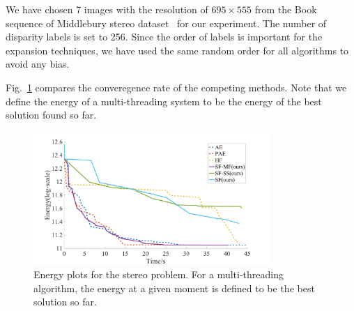 
\noindent We have chosen 7 images with the resolution of $695\times555$
from the Book sequence of Middlebury stereo dataset~\cite{middlebury_stereo} for our
experiment. The number of disparity labels is
set to 256. 
%
Since the order of labels is important for the expansion techniques,
we have used the same random order for all algorithms to avoid any
bias. 
%

Fig.~\ref{fig:stereo_global} compares the converegence rate of the
competing methods. Note that we define the energy of a multi-threading
system to be the energy of the best solution found so far.
%

\begin{figure}[tb]
\centering
\includegraphics[width=0.8\textwidth]{figure/stereo_global.png}
\caption{Energy plots for the stereo problem. For a multi-threading algorithm, the energy at a given moment is
defined to be the best solution so far.}
\label{fig:stereo_global}
\end{figure}
%

